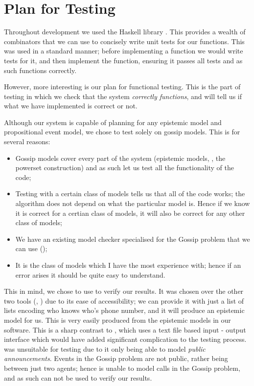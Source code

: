 \documentclass[10pt, a4paper]{report}
\begin{document}
\section{Plan for Testing}

Throughout development we used the Haskell library . This provides
a wealth of combinators that we can use to concisely write unit tests for our
functions. This was used in a standard manner; before implementing a function we
would write tests for it, and then implement the function, ensuring it passes
all tests and as such functions correctly.

However, more interesting is our plan for functional testing. This is the part
of testing in which we check that the system \emph{correctly functions}, and
will tell us if what we have implemented is correct or not.

Although our system is capable of planning for any epistemic model and
propositional event model, we chose to test solely on gossip models. This is
for several reasons:

\begin{itemize}
\item Gossip models cover every part of the system (epistemic models, \mestar,
  the powerset construction) and as such let us test all the functionality of
  the code;
\item Testing with a certain class of models tells us that all of the code
  works; the algorithm does not depend on what the particular model is. Hence if
  we know it is correct for a certian class of models, it will also be correct
  for any other class of models;
\item We have an existing model checker specialised for the Gossip problem that we can use
  (\cite{GithubGossip});
\item It is the class of models which I have the most experience with; hence if
  an error arises it should be quite easy to understand.
\end{itemize}

This in mind, we chose to use \cite{GithubGossip} to verify our results. It was
chosen over the other two tools (\cite{SMCDEL}, \cite{DEMO-S5}) due to its ease
of accessibility; we can provide it with just a list of lists encoding who knows
who's phone number, and it will produce an epistemic model for us. This is very
easily produced from the epistemic models in our software. This is a sharp
contrast to \cite{SMCDEL}, which uses a text file based input - output interface
which would have added significant complication to the testing process.
\cite{DEMO-S5} was unsuitable for testing due to it only being able to model
\emph{public announcements}. Events in the Gossip problem are not public, rather
being between just two agents; hence \cite{DEMO-S5} is unable to model calls in
the Gossip problem, and as such can not be used to verify our results.
\end{document}
